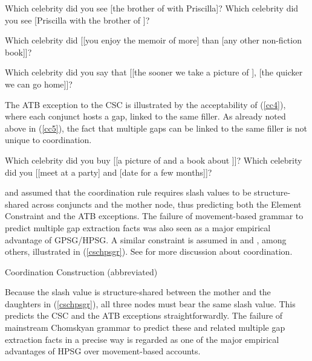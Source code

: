 \documentclass[output=paper
	        ,collection
	        ,collectionchapter
 	        ,biblatex
                ,babelshorthands
                ,newtxmath
                ,draftmode
                ,colorlinks, citecolor=brown
]{langscibook}
\begin{document}
 

\eal
\label{cc2}
\zl

\eal 
\label{cc3} 
\ex Which celebrity did you see [the brother of \spc with Priscilla]?
\ex Which celebrity did you see [Priscilla with the brother of \spc]?
\zl

\eal
\label{compar} 
\ex Which celebrity did  [[you enjoy the memoir of \spcs more] than
                                 [any other non-fiction book]]?

\ex Which celebrity did you say that [[the sooner we take a picture of \spc ],
[the quicker we can go home]]?
\zl


The ATB exception to the CSC is illustrated by the acceptability of (\ref{cc4}), where each conjunct hosts a gap, linked to the same filler. As already noted above in (\ref{cc5}), the fact that multiple gaps can be linked to the same filler is not unique to  coordination. 

\eal\label{cc4}
\ex Which celebrity did you buy [[a picture of  \spcs and a book about \spcs]]?
\ex Which celebrity  did you [[meet \spcs at a party] and [date \spcs for a few months]]?
\zl


\citet{gazdar} and \citet{gpsg} assumed that the coordination rule  requires {\sc slash} values to be structure-shared across conjuncts and the mother node, thus  predicting  both the Element Constraint and the ATB exceptions. The failure of
movement-based grammar to predict multiple gap extraction facts was also seen
as a major empirical advantage of GPSG/HPSG. A similar constraint is assumed in \citet[202]{pollardsag} and
\citet[60]{Beavers}, among others, illustrated in (\ref{cschpsgr}). See   for more discussion about coordination. 

\ea
\label{cschpsgr}
{\sc Coordination Construction} (abbreviated)

\z

\noindent
Because   the {\sc slash} value  is structure-shared between the mother and the daughters
in (\ref{cschpsgr}),  all  three nodes must bear the same {\sc slash} value.  This predicts the CSC and the ATB exceptions  straightforwardly. The failure of mainstream Chomskyan  grammar to predict these and related multiple  gap extraction facts in a precise way is regarded as one of the  major empirical advantages of HPSG  over movement-based accounts.
\end{document}
